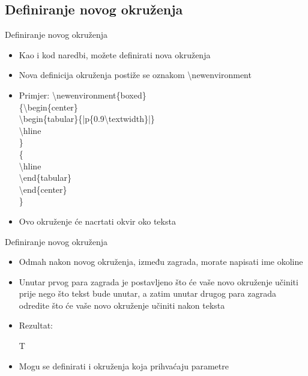 \documentclass{beamer}
\begin{document}
\subsection{Definiranje novog okruženja}

\begin{frame}{Definiranje novog okruženja}
\begin{itemize}

\item Kao i kod naredbi, možete definirati nova okruženja
\item Nova definicija okruženja postiže se oznakom \textbackslash newenvironment
\item Primjer:
\textbackslash newenvironment\{boxed\}\\
\{\textbackslash begin\{center\}\\
    \textbackslash begin\{tabular\}\{|p\{0.9\textbackslash textwidth\}|\}\\
    \textbackslash hline\\
    \}\\
    \{ \\
    \textbackslash hline\\
    \textbackslash end\{tabular\} \\
    \textbackslash end\{center\}\\
    \}\\
    \item Ovo okruženje će nacrtati okvir oko teksta
\end{itemize}
\end{frame}



\begin{frame}[t]{Definiranje novog okruženja}
\begin{itemize}
	\item Odmah nakon novog okruženja, između zagrada, morate napisati ime okoline
	\item Unutar prvog para zagrada je postavljeno što će vaše novo okruženje učiniti prije nego što tekst bude unutar, a zatim unutar drugog para zagrada odredite što će vaše novo okruženje učiniti nakon teksta
\item Rezultat:
\begin{boxed}
T
\end{boxed}

	\item Mogu se definirati i okruženja koja prihvaćaju parametre

\end{itemize}
\end{frame}
\end{document}
